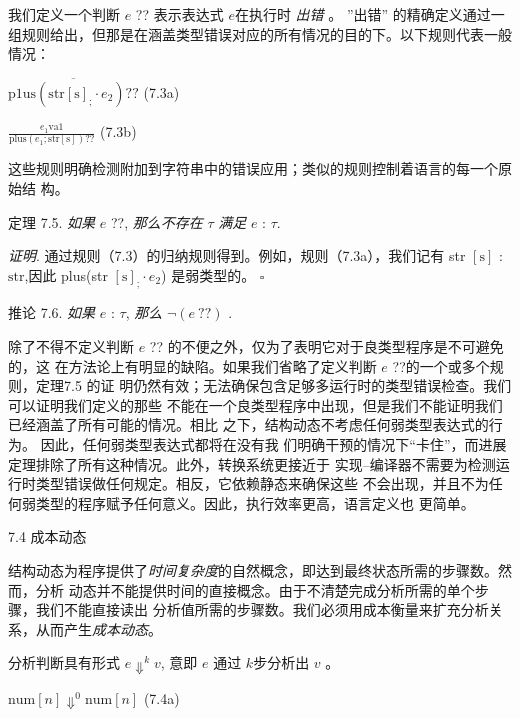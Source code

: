 我们定义一个判断 $e$ ?? 表示表达式 $e$在执行时 {\it 出错} 。 ''出错'' 的精确定义通过一组规则给出，但那是在涵盖类型错误对应的所有情况的目的下。以下规则代表一般情况：
\begin{center}
$\overline{\mathrm{p}1\mathrm{u}\mathrm{s}(\mathrm{s}\mathrm{t}\mathrm{r}[\mathrm{s}]_{;}\cdot e_{2})??}$   (7.3a)

$\displaystyle \frac{e_{1}\mathrm{v}\mathrm{a}1}{\mathrm{p}\mathrm{l}\mathrm{u}\mathrm{s}(e_{1};\mathrm{s}\mathrm{t}\mathrm{r}[\mathrm{s}])??}$   (7.3b)
\end{center}
这些规则明确检测附加到字符串中的错误应用；类似的规则控制着语言的每一个原始结
构。

定理 7.5. {\it 如果} $e$ ??, {\it 那么不存在} $\tau$ {\it 满足} $e$ : $\tau.$

{\it 证明}. 通过规则（7.3）的归纳规则得到。例如，规则（7.3a），我们记有 str $[\mathrm{s}]$ : $\mathrm{s}\mathrm{t}\mathrm{r}$,因此 plus(str $[\mathrm{s}]_{;}\cdot e_{2}$) 是弱类型的。  $\square $

推论 7.6. {\it 如果} $e$ : $\tau$, {\it 那么} $\neg (e\ ??)$ .

除了不得不定义判断 $e$ ?? 的不便之外，仅为了表明它对于良类型程序是不可避免的，这
在方法论上有明显的缺陷。如果我们省略了定义判断 $e$ ??的一个或多个规则，定理7.5 的证
明仍然有效；无法确保包含足够多运行时的类型错误检查。我们可以证明我们定义的那些
不能在一个良类型程序中出现，但是我们不能证明我们已经涵盖了所有可能的情况。相比
之下，结构动态不考虑任何弱类型表达式的行为。 因此，任何弱类型表达式都将在没有我
们明确干预的情况下“卡住”，而进展定理排除了所有这种情况。此外，转换系统更接近于
实现--编译器不需要为检测运行时类型错误做任何规定。相反，它依赖静态来确保这些
不会出现，并且不为任何弱类型的程序赋予任何意义。因此，执行效率更高，语言定义也
更简单。

7.4 成本动态

结构动态为程序提供了{\it 时间复杂度}的自然概念，即达到最终状态所需的步骤数。然而，分析
动态并不能提供时间的直接概念。由于不清楚完成分析所需的单个步骤，我们不能直接读出
分析值所需的步骤数。我们必须用成本衡量来扩充分析关系，从而产生{\it 成本动态}。 

分析判断具有形式 $e\Downarrow^{k}v$, 意即 $e$ 通过 $k$步分析出 $v$ 。
\begin{center}
$\mathrm{n}\mathrm{u}\mathrm{m}[n]\Downarrow^{0}\mathrm{n}\mathrm{u}\mathrm{m}[n]$   (7.4a)
\end{center}

